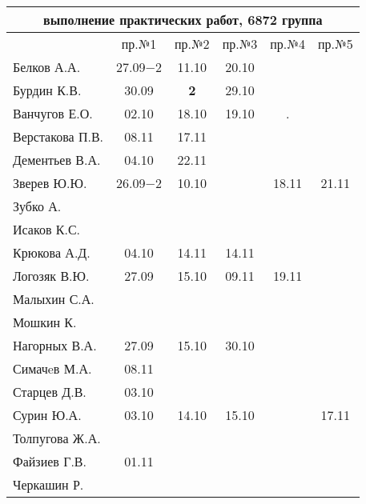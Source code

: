 \documentclass[a4paper,landscape,11pt]{article}
\begin{document}
\newpage
\begin{tabular}{l|ccccc}
\multicolumn{6}{c}{выполнение практических работ, 6872 группа} \\
\toprule
& пр.№1 & пр.№2 & пр.№3 & пр.№4 & пр.№5\\
\midrule
Белков А.А.    &27.09$-2$&11.10  &20.10& &\\   
Бурдин К.В.    &30.09    &{\bf 2}&29.10& &\\
Ванчугов Е.О.  &02.10    &18.10  &19.10& .&\\
Верстакова П.В.&08.11    &17.11  &     & &\\
Дементьев В.А. &04.10    &22.11  &     & &\\
Зверев Ю.Ю.    &26.09$-2$&10.10  &     &18.11&21.11\\
Зубко А.       &         &       &     & &\\
Исаков К.С.    &         &       &     & &\\
Крюкова А.Д.   &04.10    &14.11  &14.11& &\\
Логозяк В.Ю.   &27.09    &15.10  &09.11&19.11&\\
Малыхин С.А.   &         &       &     & &\\
Мошкин К.      &         &       &     & &\\
Нагорных В.А.  &27.09    &15.10  &30.10& &\\
Симачeв М.А.   &08.11    &       &     & &\\
Старцев Д.В.   &03.10    &       &     & &\\
Сурин Ю.А.     &03.10    &14.10  &15.10& &17.11\\
Толпугова Ж.А. &         &       &     & &\\
Файзиев Г.В.   &01.11    &       &     & &\\
Черкашин Р.    &         &       &     & &\\
\bottomrule
\end{tabular}
\end{document}
